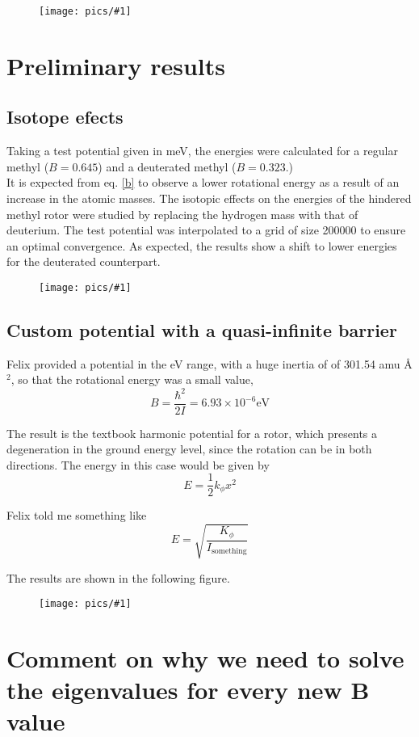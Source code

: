 \documentclass[12pt,a4paper]{article}
\newcommand{\NEWPICC}[2]{
\begin{figure}[H]
    \centering
    \texttt{[image: pics/\#1]}
    \label{#1}
    \end{figure}
    }
\begin{document}
\NEWPICC{titov2023_1.png}{1}


\section{Preliminary results}

\subsection{Isotope efects}


Taking a test potential given in meV, the energies were calculated for a regular methyl ($B=0.645$) and a deuterated methyl ($B=0.323$.)\\

It is expected from eq. \eqref{b} to observe a lower rotational energy as a result of an increase in the atomic masses. The isotopic effects on the energies of the hindered methyl rotor were studied by replacing the hydrogen mass with that of deuterium. The test potential was interpolated to a grid of size 200000 to ensure an optimal convergence. As expected, the results show a shift to lower energies for the deuterated counterpart.

\NEWPICC{interpolate_potential_HD.png}{1}


\subsection{Custom potential with a quasi-infinite barrier}

Felix provided a potential in the eV range, with a huge inertia of of 301.54 amu \AA$^2$, so that the rotational energy was a small value,
$$
B = \frac{\hbar^2}{2 I} = 6.93 \times 10^{-6} \text{eV}
$$

The result is the textbook harmonic potential for a rotor, which presents a degeneration in the ground energy level, since the rotation can be in both directions. The energy in this case would be given by
$$
E = \frac{1}{2} k_{\phi} x^2
$$

Felix told me something like 
$$
E=\sqrt{\frac{K_{\phi}}{I_{\text{something}}}}
$$

The results are shown in the following figure.


\NEWPICC{potential_felix.png}{0.95}


\section{Comment on why we need to solve the eigenvalues for every new B value}
\end{document}

